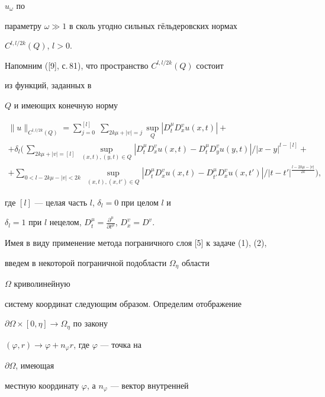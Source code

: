 $u_\omega$ по  


параметру $\omega{\gg}1$ в сколь угодно сильных г\"ельдеровских нормах 


$C^{l,l/2k}(Q)$, $l>0$. 


Напомним ([9], с.\,81), что пространство $C^{l,l/2k}(Q)$ состоит 


из функций, заданных в  


$Q$ и имеющих конечную норму 


\begin{multline*} 


\|u\|_{C^{l,l/2k}(Q)}=\sum^{[l]}_{j=0}\; 


\sum_{2k\mu+|\upsilon|=j}\sup_Q|D^\mu_t D^v_x u(x,t)|+ \\ 


% 


+\delta_l\bigg(\,\sum_{2k\mu+|v|=[l]}\;\sup_{(x,t),(y,t)\in Q} 


|D^\mu_t D^v_x u(x,t)-D^\mu_t D^v_y u(y,t)|/ 


|x-y|^{l-[l]}+ \\ 


% 


+\sum_{0<l-2k\mu-|v|<2k}\;\sup_{(x,t),(x,t')\in Q} 


|D^\mu_t D^v_x u(x,t)-D^\mu_{t'}D^v_x u(x,t')| /


|t-t'|^{\frac{l-2k\mu-|v|}{2k}}\bigg), 


\end{multline*} 


где $[l]$ --- целая часть $l$, $\delta_l=0$ при целом $l$ и 


$\delta_l=1$ при $l$ нецелом, $D^\mu_t=\frac{\partial^\mu}{\partial 


t^\mu}$, $D^v_x=D^v$. 


 


Имея в виду применение метода пограничного слоя [5] к задаче (1), (2),  


введем в некоторой пограничной подобласти $\Omega_\eta$ области 


$\Omega$ криволинейную 


систему координат следующим образом. Определим отображение  


$\partial\Omega\times[0,\eta]\to\Omega_\eta$ по закону 


$(\varphi,r)\to\varphi+n_\varphi r$, где $\varphi$ --- точка на 


$\partial\Omega$, имеющая 


местную координату $\varphi$, а $n_\varphi$ --- вектор внутренней 


